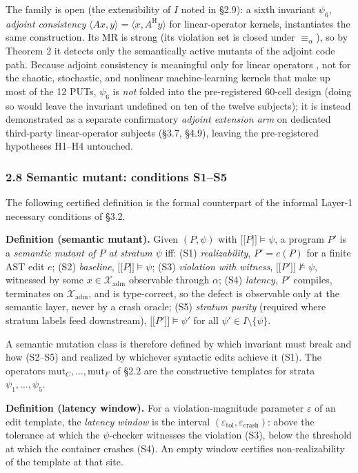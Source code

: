\documentclass[review,12pt,authoryear]{elsarticle}
\providecommand{\llbracket}{\mathopen{\lbrack\!\lbrack}}
\providecommand{\rrbracket}{\mathclose{\rbrack\!\rbrack}}
\begin{document}
The family is open (the extensibility of $I$ noted in §2.9): a sixth
invariant $\psi_6$, \emph{adjoint consistency}
$\langle A x, y\rangle = \langle x, A^{\mathrm{H}} y\rangle$ for
linear-operator kernels, instantiates the same construction. Its MR is
strong (its violation set is closed under $\equiv_\alpha$), so by Theorem
2 it detects only the semantically active mutants of the adjoint code
path. Because adjoint consistency is meaningful only for linear operators
, not for the chaotic, stochastic, and nonlinear machine-learning
kernels that make up most of the 12 PUTs, $\psi_6$ is \emph{not} folded
into the pre-registered 60-cell design (doing so would leave the invariant
undefined on ten of the twelve subjects); it is instead demonstrated as a
separate confirmatory \emph{adjoint extension arm} on dedicated
third-party linear-operator subjects (§3.7, §4.9), leaving the
pre-registered hypotheses H1--H4 untouched.

\subsubsection{2.8 Semantic mutant: conditions S1--S5}\label{theory-s1s5}

The following certified definition is the formal counterpart of the
informal Layer-1 necessary conditions of §3.2.

\textbf{Definition (semantic mutant).} Given $(P, \psi)$ with
$\llbracket P \rrbracket \models \psi$, a program $P'$ is a
\emph{semantic mutant of $P$ at stratum $\psi$} iff: (S1)
\emph{realizability}, $P' = e(P)$ for a finite AST edit $e$; (S2)
\emph{baseline}, $\llbracket P \rrbracket \models \psi$; (S3)
\emph{violation with witness},
$\llbracket P' \rrbracket \not\models \psi$, witnessed by some
$x \in \mathcal{X}_{\mathrm{adm}}$ observable through $\alpha$; (S4)
\emph{latency}, $P'$ compiles, terminates on $\mathcal{X}_{\mathrm{adm}}$,
and is type-correct, so the defect is observable only at the semantic
layer, never by a crash oracle; (S5) \emph{stratum purity} (required
where stratum labels feed downstream),
$\llbracket P' \rrbracket \models \psi'$ for all
$\psi' \in I \setminus \{\psi\}$.

A semantic mutation class is therefore defined by which invariant must
break and how (S2--S5) and realized by whichever syntactic edits achieve
it (S1). The operators $\mathrm{mut}_C, \dots, \mathrm{mut}_F$ of §2.2
are the constructive templates for strata $\psi_1, \dots, \psi_5$.

\textbf{Definition (latency window).} For a violation-magnitude
parameter $\varepsilon$ of an edit template, the \emph{latency window}
is the interval $(\varepsilon_{\mathrm{tol}}, \varepsilon_{\mathrm{crash}})$:
above the tolerance at which the $\psi$-checker witnesses the violation
(S3), below the threshold at which the container crashes (S4). An empty
window certifies non-realizability of the template at that site.
\end{document}
